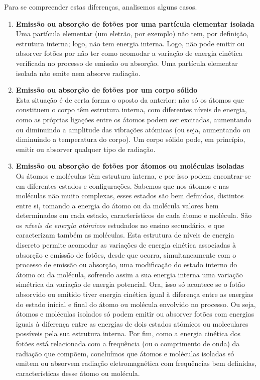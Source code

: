 Para se compreender estas diferenças, analisemos alguns casos.
\begin{enumerate}
\item
    \textbf{Emissão ou absorção de fotões por uma partícula elementar isolada}\\
    Uma partícula elementar (um eletrão, por exemplo) não tem, por definição,
    estrutura interna; logo, não tem energia interna. Logo, não pode emitir ou
    absorver fotões por não ter como acomodar a variação de energia cinética
    verificada no processo de emissão ou absorção. Uma partícula elementar
    isolada não emite nem absorve radiação.
\item
    \textbf{Emissão ou absorção de fotões por um corpo sólido}\\
    Esta situação é de certa forma o oposto da anterior: não só os átomos que
    constituem o corpo têm estrutura interna, com diferentes níveis de energia,
    como as próprias ligações entre os átomos podem ser excitadas, aumentando ou
    diminuindo a amplitude das vibrações atómicas (ou seja, aumentando ou
    diminuindo a temperatura do corpo). Um corpo sólido pode, em princípio,
    emitir ou absorver qualquer tipo de radiação.
\item
    \textbf{Emissão ou absorção de fotões por átomos ou moléculas isoladas}\\
    Os átomos e moléculas têm estrutura interna, e por isso podem encontrar-se
    em diferentes estados e configurações. Sabemos que nos átomos e nas
    moléculas não muito complexas, esses estados são bem definidos, distintos
    entre si, tomando a energia do átomo ou da molécula valores bem determinados
    em cada estado, característicos de cada átomo e molécula. São os
    \emph{níveis de energia atómicos} estudados no ensino secundário, e que
    caracterizam também as moléculas. Esta estrutura de níveis de energia
    discreto permite acomodar as variações de energia cinética associadas à
    absorção e emissão de fotões, desde que ocorra, simultaneamente com o
    processo de emissão ou absorção, uma modificação do estado interno do átomo
    ou da molécula, sofrendo assim a sua energia interna uma variação simétrica
    da variação de energia potencial. Ora, isso só acontece se o fotão absorvido
    ou emitido tiver energia cinética igual à diferença entre as energias do
    estado inicial e final do átomo ou molécula envolvido no processo. Ou seja,
    átomos e moléculas isolados só podem emitir ou absorver fotões com energias
    iguais à diferença entre as energias de dois estados atómicos ou moleculares
    possíveis pela sua estrutura interna. Por fim, como a energia cinética dos
    fotões está relacionada com a frequência (ou o comprimento de onda) da
    radiação que compõem, concluímos que átomos e moléculas isoladas só emitem
    ou absorvem radiação eletromagnética com frequências bem definidas,
    características desse átomo ou molécula.
\end{enumerate}

